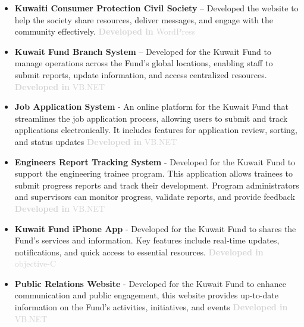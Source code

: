 \documentclass[11pt]{article}
\begin{document}
\begin{itemize}
               \item \label{sec: KCPCS}  \textbf{Kuwaiti Consumer Protection Civil Society} – Developed the website to help the society share resources, deliver messages, and engage with the community effectively. \textcolor{lightgray} { \textbf{Developed in}  WordPress}  {\href{https://www.kwcpcs.com/}{\color{icnclr} \faGlobe[regular] }}

                 \vspace{0.8em} %
               \item \label{sec: Kfund-BranchSystem}  \textbf{Kuwait Fund Branch System} – Developed for the Kuwait Fund to manage operations across the Fund’s global locations, enabling staff to submit reports, update information, and access centralized resources. \textcolor{lightgray} { \textbf{Developed in}  VB.NET } 
                \vspace{0.8em} %
                \item \label{sec: Kfund-Job}  \textbf{Job Application System} - An online platform for the Kuwait Fund that streamlines the job application process, allowing users to submit and track applications electronically. It includes features for application review, sorting, and status updates \textcolor{lightgray} { \textbf{Developed in}  VB.NET } 
          \vspace{0.8em} %
                \item \label{sec: Kfund-TrackingSystem}  \textbf{ Engineers Report Tracking System} - Developed for the Kuwait Fund to support the engineering trainee program. This application allows trainees to submit progress reports and track their development. Program administrators and supervisors can monitor progress, validate reports, and provide feedback   \textcolor{lightgray} { \textbf{Developed in}  VB.NET }     
                  \vspace{0.8em} %
                \item   \label{sec: Kfund-iphone}  \textbf{ Kuwait Fund iPhone App} - Developed for the Kuwait Fund to shares the Fund’s services and information. Key features include real-time updates, notifications, and quick access to essential resources.
\textcolor{lightgray} { \textbf{Developed in}  objective-C} 
               \vspace{0.8em} %
                \item   \label{sec: Kfund-PublicRelations} \textbf{Public Relations Website} - Developed for the Kuwait Fund to enhance communication and public engagement, this website provides up-to-date information on the Fund’s activities, initiatives, and events \textcolor{lightgray} { \textbf{Developed in}  VB.NET } 
            

\end{itemize}
\end{document}
